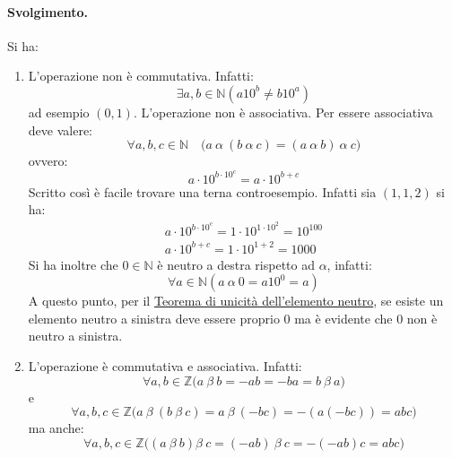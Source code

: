 \paragraph*{Svolgimento.}
Si ha:
\begin{enumerate}
	\item L'operazione non è commutativa. Infatti:
	\begin{displaymath}
		\exists a,b \in \mathbb{N} (a 10^{b} \neq b 10^{a})
	\end{displaymath}
	ad esempio $(0,1)$.
	L'operazione non è associativa. Per essere associativa deve valere:
	\begin{displaymath}
		\forall a,b,c \in \mathbb{N}\quad  \bigl(	a \ \alpha \ (b \ \alpha \ c) = (a \ \alpha \  b) \ \alpha \ c  \bigr)
	\end{displaymath}
	ovvero:
	\begin{displaymath}
		a \cdot 10 ^{b \cdot 10 ^{c}} = a \cdot 10 ^{b+c}
	\end{displaymath}
	Scritto così è facile trovare una terna controesempio. Infatti sia $(1,1,2)$ si ha:
	\begin{displaymath}
		\begin{array}{l}
			a \cdot 10 ^{b \cdot 10 ^{c}} = 1 \cdot 10^{1 \cdot 10^{2}} = 10 ^{100}\\
			a \cdot 10 ^{b+c} = 1 \cdot 10^{1+2}= 1000
		\end{array}
	\end{displaymath}
	Si ha inoltre che $0 \in \mathbb{N}$ è neutro a destra rispetto ad $\alpha$, infatti:
	\begin{displaymath}
		\forall a \in \mathbb{N} (a \ \alpha \ 0 = a 10^{0} = a)
	\end{displaymath}
	A questo punto, per il \hyperlink{thm:neutro}{Teorema di unicità dell'elemento neutro}, se esiste un elemento neutro a sinistra deve essere proprio $0$ ma è evidente che $0$ non è neutro a sinistra.
	\item L'operazione è commutativa e associativa. Infatti:
	\begin{displaymath}
		\forall a,b \in \mathbb{Z} \bigl( a \ \beta \ b = -ab = -ba = b \ \beta \ a  \bigr)
	\end{displaymath}
	e
	\begin{displaymath}
		\forall a,b,c \in \mathbb{Z} \bigl(a \ \beta \ (b \ \beta \ c) = a \ \beta \ (-bc) = -(a(-bc))= abc\bigr)
	\end{displaymath}
	ma anche:
	\begin{displaymath}
		\forall a,b,c \in \mathbb{Z} \bigl((a \ \beta \ b) \beta \ c = (-ab) \ \beta \ c = -(-ab)c=abc\bigr)

\end{displaymath}
\end{enumerate}
